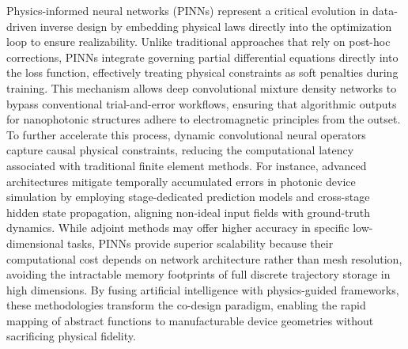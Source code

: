 \documentclass[11pt]{article}
\begin{document}
Physics-informed neural networks (PINNs) represent a critical evolution in data-driven inverse design by embedding physical laws directly into the optimization loop to ensure realizability. Unlike traditional approaches that rely on post-hoc corrections, PINNs integrate governing partial differential equations directly into the loss function, effectively treating physical constraints as soft penalties during training. \citep{doi_10_1007_s10444_023_10065_9_12bf0652} \citep{s2_cc39d5405a933620426d86298fa8fe4cd51915c5_27626ee3} This mechanism allows deep convolutional mixture density networks to bypass conventional trial-and-error workflows, ensuring that algorithmic outputs for nanophotonic structures adhere to electromagnetic principles from the outset. To further accelerate this process, dynamic convolutional neural operators capture causal physical constraints, reducing the computational latency associated with traditional finite element methods. For instance, advanced architectures mitigate temporally accumulated errors in photonic device simulation by employing stage-dedicated prediction models and cross-stage hidden state propagation, aligning non-ideal input fields with ground-truth dynamics. While adjoint methods may offer higher accuracy in specific low-dimensional tasks, PINNs provide superior scalability because their computational cost depends on network architecture rather than mesh resolution, avoiding the intractable memory footprints of full discrete trajectory storage in high dimensions. By fusing artificial intelligence with physics-guided frameworks, these methodologies transform the co-design paradigm, enabling the rapid mapping of abstract functions to manufacturable device geometries without sacrificing physical fidelity. \citep{doi_10_48550_arxiv_2406_17810_813bd2a3} \citep{s2_037e66f37189104d61c0d000de0cee202b7eec9e_d15b8018} \citep{doi_10_48550_arxiv_2606_12337_68b62bfa}
\end{document}
